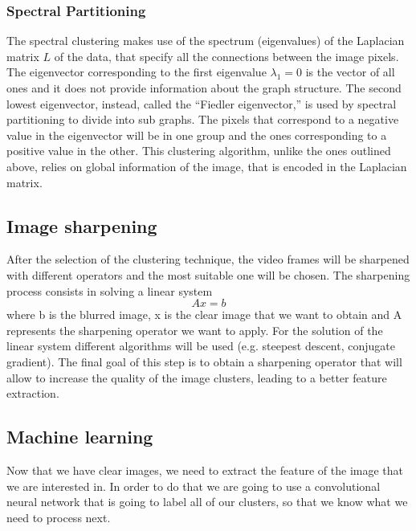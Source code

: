 \documentclass[11pt]{article}
\begin{document}
\subsubsection{Spectral Partitioning}
The spectral clustering makes use of the spectrum (eigenvalues) of the Laplacian matrix $L$ of the data, that specify all the connections between the image pixels.
The eigenvector corresponding to the first eigenvalue $\lambda_1=0$ is the vector of all ones and it does not provide information about the graph structure. The second lowest eigenvector, instead, called the ``Fiedler eigenvector,'' is used by spectral partitioning to divide into sub graphs. The pixels that correspond to a negative value in the eigenvector will be in one group and the ones corresponding to a positive value in the other. This clustering algorithm, unlike the ones outlined above, relies on global information of the image, that is encoded in the Laplacian matrix.


\subsection{Image sharpening}
After the selection of the clustering technique, the video frames will be sharpened with different operators and the most suitable one will be chosen. The sharpening process consists in solving a linear system
$$Ax=b$$
where b is the blurred image, x is the clear image that we want to obtain and A represents the sharpening operator we want to apply. For the solution of the linear system different algorithms will be used (e.g. steepest descent, conjugate gradient).
The final goal of this step is to obtain a sharpening operator that will allow to increase the quality of the image clusters, leading to a better feature extraction. 

\subsection{Machine learning}
Now that we have clear images, we need to extract the feature of the image that we are interested in. In order to do that we are going to use a convolutional neural network that is going to label all of our clusters, so that we know what we need to process next.
\end{document}
